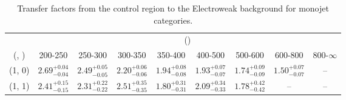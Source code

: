\begin{table}[h!]
\tiny
\centering
\caption{Transfer factors from the \mj control region to the Electroweak background for monojet categories.\label{tab:tf_mu_total_mono}}
\begin{tabular}
{ccccccccc}
	\hline\hline
	& \multicolumn{8}{c}{\scalht (\gev)} \\ 
	 (\njet,  \nb) & 200-250 & 250-300 & 300-350 & 350-400 & 400-500 & 500-600 & 600-800 & 800-$\infty$ \\ [0.8ex] 
\hline
	(1, 0) & $2.69^{+ 0.04 }_{- 0.04 }$ & $2.49^{+ 0.05 }_{- 0.05 }$ & $2.20^{+ 0.06 }_{- 0.06 }$ & $1.94^{+ 0.08 }_{- 0.08 }$ & $1.93^{+ 0.07 }_{- 0.07 }$ & $1.74^{+ 0.09 }_{- 0.09 }$ & $1.50^{+ 0.07 }_{- 0.07 }$ & -- \\[0.5ex] 
	(1, 1) & $2.41^{+ 0.15 }_{- 0.15 }$ & $2.31^{+ 0.22 }_{- 0.22 }$ & $2.51^{+ 0.35 }_{- 0.35 }$ & $1.80^{+ 0.31 }_{- 0.31 }$ & $2.09^{+ 0.34 }_{- 0.33 }$ & $1.78^{+ 0.42 }_{- 0.42 }$ & -- & -- \\[0.5ex] 
	\hline
	\hline
\end{tabular}
\end{table}
